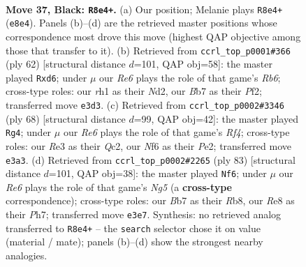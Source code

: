 \documentclass[11pt]{article}
\begin{document}
\clearpage

\begin{figure}[p]\centering
\begin{subfigure}{0.46\textwidth}\centering
\resizebox{\linewidth}{!}{%
\newchessgame
\chessboard[
  setfen={4rk2/1b3p1P/qp3n2/1N1p2N1/P2P1K2/4r1R1/2Q5/7R b - - 2 37},
  showmover=false,
  pgfstyle=straightmove, color=movearrow, markmove={e8-e4}
]}
\caption{}
\end{subfigure}\hfill
\begin{subfigure}{0.46\textwidth}\centering
\resizebox{\linewidth}{!}{%
\newchessgame
\chessboard[
  setfen={r5k1/2q3p1/1R1r1p1p/n3p2P/P1p1P3/2Q5/3N1PP1/1R4K1 w - - 0 32},
  showmover=false,
  pgfstyle=straightmove, color=movearrow, markmove={b6-d6}
]}
\caption{}
\end{subfigure}
\\[4pt]
\begin{subfigure}{0.46\textwidth}\centering
\resizebox{\linewidth}{!}{%
\newchessgame
\chessboard[
  setfen={6k1/6p1/p2qp3/1pn2r2/2p2R1P/P1P5/2Q1P3/5RK1 w - - 7 35},
  showmover=false,
  pgfstyle=straightmove, color=movearrow, markmove={f4-g4}
]}
\caption{}
\end{subfigure}\hfill
\begin{subfigure}{0.46\textwidth}\centering
\resizebox{\linewidth}{!}{%
\newchessgame
\chessboard[
  setfen={1r6/5k1p/p7/p3r2p/2P1p1n1/4N1R1/1q3PP1/R3Q1K1 b - - 1 42},
  showmover=false,
  pgfstyle=straightmove, color=movearrow, markmove={g4-f6}
]}
\caption{}
\end{subfigure}
\caption{\textbf{Move 37, Black: \texttt{R8e4+}.} (a) Our position; Melanie plays \texttt{R8e4+} (\texttt{e8e4}). Panels (b)--(d) are the retrieved master positions whose correspondence most drove this move (highest QAP objective among those that transfer to it). (b) Retrieved from \texttt{ccrl\_top\_p0001\#366} (ply 62) [structural distance $d$=101, QAP obj=58]: the master played \texttt{Rxd6}; under $\mu$ our \emph{Re6} plays the role of that game's \emph{Rb6}; cross-type roles: our \emph{r}h1 as their \emph{N}d2, our \emph{B}b7 as their \emph{P}f2; transferred move \texttt{e3d3}. (c) Retrieved from \texttt{ccrl\_top\_p0002\#3346} (ply 68) [structural distance $d$=99, QAP obj=42]: the master played \texttt{Rg4}; under $\mu$ our \emph{Re6} plays the role of that game's \emph{Rf4}; cross-type roles: our \emph{R}e3 as their \emph{Q}c2, our \emph{N}f6 as their \emph{P}e2; transferred move \texttt{e3a3}. (d) Retrieved from \texttt{ccrl\_top\_p0002\#2265} (ply 83) [structural distance $d$=101, QAP obj=38]: the master played \texttt{Nf6}; under $\mu$ our \emph{Re6} plays the role of that game's \emph{Ng5} (a \textbf{cross-type} correspondence); cross-type roles: our \emph{B}b7 as their \emph{R}b8, our \emph{R}e8 as their \emph{P}h7; transferred move \texttt{e3e7}. Synthesis: no retrieved analog transferred to \texttt{R8e4+} -- the \texttt{search} selector chose it on value (material / mate); panels (b)--(d) show the strongest nearby analogies.}
\label{fig:thought-m73}
\end{figure}
\end{document}
